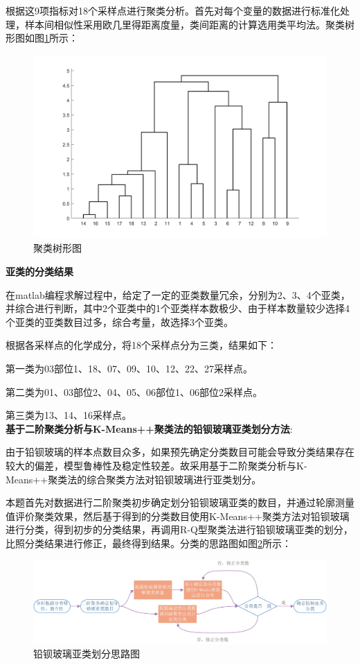 \documentclass{my_paper}
\begin{document}
根据这9项指标对18个采样点进行聚类分析。首先对每个变量的数据进行标准化处理，样本间相似性采用欧几里得距离度量，类间距离的计算选用类平均法。聚类树形图如图\ref{Q型聚类图}所示：
\begin{figure}[H]
    \centering
    \includegraphics[width=1\textwidth]{Q型聚类图.jpg}
    \caption{聚类树形图}
    \label{Q型聚类图}
\end{figure}
\textbf{亚类的分类结果}

在matlab编程求解过程中，给定了一定的亚类数量冗余，分别为2、3、4个亚类，并综合进行判断，其中2个亚类中的1个亚类样本数极少、由于样本数量较少选择4个亚类的亚类数目过多，综合考量，故选择3个亚类。

根据各采样点的化学成分，将18个采样点分为三类，结果如下：

第一类为03部位1、18、07、09、10、12、22、27采样点。

第二类为01、03部位2、04、05、06部位1、06部位2采样点。

第三类为13、14、16采样点。\\




\textbf{基于二阶聚类分析与K-Means++聚类法的铅钡玻璃亚类划分方法}:\par
由于铅钡玻璃的样本点数目众多，如果预先确定分类数目可能会导致分类结果存在较大的偏差，模型鲁棒性及稳定性较差。故采用基于二阶聚类分析与K-Means++聚类法的综合聚类方法对铅钡玻璃进行亚类划分。\par
本题首先对数据进行二阶聚类初步确定划分铅钡玻璃亚类的数目，并通过轮廓测量值评价聚类效果，然后基于得到的分类数目使用K-Means++聚类方法对铅钡玻璃进行分类，得到初步的分类结果，再调用R-Q型聚类法进行铅钡玻璃亚类的划分，比照分类结果进行修正，最终得到结果。分类的思路图如图\ref{铅钡玻璃亚类划分}所示：
\begin{figure}[H]
    \centering
    \includegraphics[width=1\textwidth]{铅钡亚类分类思路图.jpg}
    \caption{铅钡玻璃亚类划分思路图}
    \label{铅钡玻璃亚类划分}
\end{figure}
\end{document}
